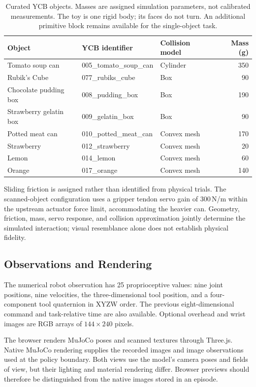 \documentclass[10pt]{article}
\begin{document}
\begin{table}[!htbp]
\centering
\small
\begin{tabular}{lllr}
\toprule
Object & YCB identifier & Collision model & Mass (g)\\
\midrule
Tomato soup can & 005\_tomato\_soup\_can & Cylinder & 350\\
Rubik's Cube & 077\_rubiks\_cube & Box & 90\\
Chocolate pudding box & 008\_pudding\_box & Box & 190\\
Strawberry gelatin box & 009\_gelatin\_box & Box & 90\\
Potted meat can & 010\_potted\_meat\_can & Convex mesh & 170\\
Strawberry & 012\_strawberry & Convex mesh & 20\\
Lemon & 014\_lemon & Convex mesh & 60\\
Orange & 017\_orange & Convex mesh & 140\\
\bottomrule
\end{tabular}
\caption{Curated YCB objects. Masses are assigned simulation parameters, not calibrated measurements. The toy is one rigid body; its faces do not turn. An additional primitive block remains available for the single-object task.}
\label{tab:objects}
\end{table}

Sliding friction is assigned rather than identified from physical trials. The scanned-object configuration uses a gripper tendon servo gain of 300\,N/m within the upstream actuator force limit, accommodating the heavier can. Geometry, friction, mass, servo response, and collision approximation jointly determine the simulated interaction; visual resemblance alone does not establish physical fidelity.

\subsection{Observations and Rendering}
The numerical robot observation has 25 proprioceptive values: nine joint positions, nine velocities, the three-dimensional tool position, and a four-component tool quaternion in XYZW order. The previous eight-dimensional command and task-relative time are also available. Optional overhead and wrist images are RGB arrays of $144\times240$ pixels.

The browser renders MuJoCo poses and scanned textures through Three.js. Native MuJoCo rendering supplies the recorded images and image observations used at the policy boundary. Both views use the model's camera poses and fields of view, but their lighting and material rendering differ. Browser previews should therefore be distinguished from the native images stored in an episode.
\end{document}
